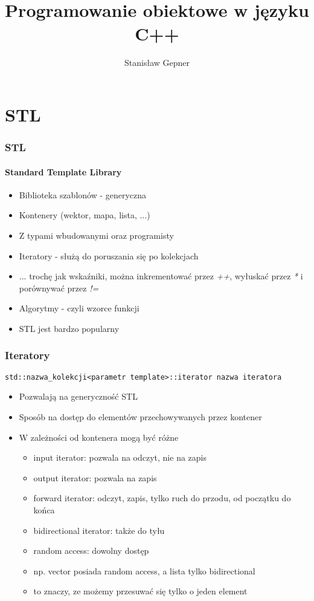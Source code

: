 \documentclass[10pt]{beamer}
\title{Programowanie obiektowe w języku C++}
\author[shortname]{Stanis{\l}aw Gepner}
\institute[shortinst]{sgepner@meil.pw.edu.pl}
\date{}
\begin{document}
\frame{
    \titlepage
}

\section{STL}

\begin{frame}
  \frametitle{STL}
  \framesubtitle{Standard Template Library}
  
  \begin{itemize}
    \item Biblioteka szablonów - generyczna
    \item Kontenery (wektor, mapa, lista, ...)
    \item Z typami wbudowanymi oraz programisty
    \item Iteratory - służą do poruszania się po kolekcjach
    \item ... trochę jak wskaźniki, można inkrementować przez \textit{++},
    wyłuskać przez \textit{*} i porównywać przez \textit{!=} 
    \item Algorytmy - czyli wzorce funkcji
    \item STL jest bardzo popularny
  \end{itemize}
\end{frame}

\begin{frame}[fragile]
  \frametitle{Iteratory}
  
\begin{lstlisting}
std::nazwa_kolekcji<parametr template>::iterator nazwa iteratora
\end{lstlisting}
  
  \begin{itemize}
    \item Pozwalają na generyczność STL
    \item Sposób na dostęp do elementów przechowywanych przez kontener
    \item W zależności od kontenera mogą być różne
    \begin{itemize}
      \item input iterator: pozwala na odczyt, nie na zapis
      \item output iterator: pozwala na zapis
      \item forward iterator: odczyt, zapis, tylko ruch do przodu, od początku do końca
      \item bidirectional iterator: także do tyłu
      \item random access: dowolny dostęp
      \item np. vector posiada random access, a lista tylko bidirectional
      \item to znaczy, ze możemy przesuwać się tylko o jeden element
    \end{itemize}
  \end{itemize}
\end{frame}
\end{document}
